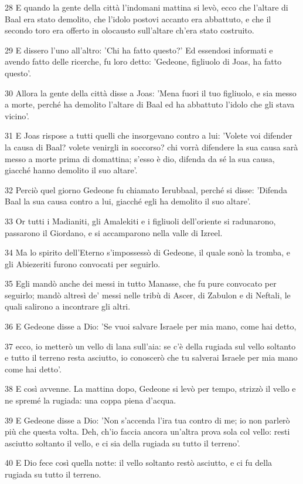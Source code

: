 \par 28 E quando la gente della città l'indomani mattina si levò, ecco che l'altare di Baal era stato demolito, che l'idolo postovi accanto era abbattuto, e che il secondo toro era offerto in olocausto sull'altare ch'era stato costruito.
\par 29 E dissero l'uno all'altro: 'Chi ha fatto questo?' Ed essendosi informati e avendo fatto delle ricerche, fu loro detto: 'Gedeone, figliuolo di Joas, ha fatto questo'.
\par 30 Allora la gente della città disse a Joas: 'Mena fuori il tuo figliuolo, e sia messo a morte, perché ha demolito l'altare di Baal ed ha abbattuto l'idolo che gli stava vicino'.
\par 31 E Joas rispose a tutti quelli che insorgevano contro a lui: 'Volete voi difender la causa di Baal? volete venirgli in soccorso? chi vorrà difendere la sua causa sarà messo a morte prima di domattina; s'esso è dio, difenda da sé la sua causa, giacché hanno demolito il suo altare'.
\par 32 Perciò quel giorno Gedeone fu chiamato Ierubbaal, perché si disse: 'Difenda Baal la sua causa contro a lui, giacché egli ha demolito il suo altare'.
\par 33 Or tutti i Madianiti, gli Amalekiti e i figliuoli dell'oriente si radunarono, passarono il Giordano, e si accamparono nella valle di Izreel.
\par 34 Ma lo spirito dell'Eterno s'impossessò di Gedeone, il quale sonò la tromba, e gli Abiezeriti furono convocati per seguirlo.
\par 35 Egli mandò anche dei messi in tutto Manasse, che fu pure convocato per seguirlo; mandò altresì de' messi nelle tribù di Ascer, di Zabulon e di Neftali, le quali salirono a incontrare gli altri.
\par 36 E Gedeone disse a Dio: 'Se vuoi salvare Israele per mia mano, come hai detto,
\par 37 ecco, io metterò un vello di lana sull'aia: se c'è della rugiada sul vello soltanto e tutto il terreno resta asciutto, io conoscerò che tu salverai Israele per mia mano come hai detto'.
\par 38 E così avvenne. La mattina dopo, Gedeone si levò per tempo, strizzò il vello e ne spremé la rugiada: una coppa piena d'acqua.
\par 39 E Gedeone disse a Dio: 'Non s'accenda l'ira tua contro di me; io non parlerò più che questa volta. Deh, ch'io faccia ancora un'altra prova sola col vello: resti asciutto soltanto il vello, e ci sia della rugiada su tutto il terreno'.
\par 40 E Dio fece così quella notte: il vello soltanto restò asciutto, e ci fu della rugiada su tutto il terreno.

